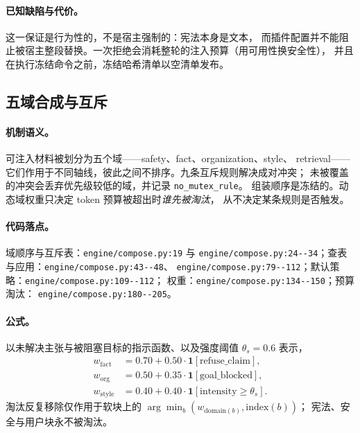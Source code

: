 \paragraph{已知缺陷与代价。} 这一保证是行为性的，不是宿主强制的：宪法本身是文本，
而插件配置并不能阻止被宿主整段替换。一次拒绝会消耗整轮的注入预算（用可用性换安全性），
并且在执行冻结命令之前，冻结哈希清单以空清单发布。

\subsection{五域合成与互斥}

\paragraph{机制语义。} 可注入材料被划分为五个域——safety、fact、organization、style、
retrieval——它们作用于不同轴线，彼此之间不排序。九条互斥规则解决成对冲突；
未被覆盖的冲突会丢弃优先级较低的域，并记录 \texttt{no\_mutex\_rule}。
组装顺序是冻结的。动态域权重只决定 token 预算被超出时\emph{谁先被淘汰}，
从不决定某条规则是否触发。

\paragraph{代码落点。} 域顺序与互斥表：\texttt{engine/\allowbreak{}compose.\allowbreak{}py:\allowbreak{}19} 与
\texttt{engine/\allowbreak{}compose.\allowbreak{}py:\allowbreak{}24-\allowbreak{}-\allowbreak{}34}；查表与应用：\texttt{engine/\allowbreak{}compose.\allowbreak{}py:\allowbreak{}43-\allowbreak{}-\allowbreak{}48}、
\texttt{engine/\allowbreak{}compose.\allowbreak{}py:\allowbreak{}79-\allowbreak{}-\allowbreak{}112}；默认策略：\texttt{engine/\allowbreak{}compose.\allowbreak{}py:\allowbreak{}109-\allowbreak{}-\allowbreak{}112}；
权重：\texttt{engine/\allowbreak{}compose.\allowbreak{}py:\allowbreak{}134-\allowbreak{}-\allowbreak{}150}；预算淘汰：
\texttt{engine/\allowbreak{}compose.\allowbreak{}py:\allowbreak{}180-\allowbreak{}-\allowbreak{}205}。

\paragraph{公式。} 以未解决主张与被阻塞目标的指示函数、以及强度阈值 $\theta_s = 0.6$ 表示，
{\small
\begin{equation}
\begin{aligned}
w_{\mathrm{fact}} &= 0.70 + 0.50\cdot\mathbf{1}[\mathrm{refuse\_claim}],\\
w_{\mathrm{org}} &= 0.50 + 0.35\cdot\mathbf{1}[\mathrm{goal\_blocked}],\\
w_{\mathrm{style}} &= 0.40 + 0.40\cdot\mathbf{1}[\mathrm{intensity} \ge \theta_s].
\end{aligned}
\end{equation}
}
淘汰反复移除仅作用于软块上的 $\arg\min_b (w_{\mathrm{domain}(b)}, \mathrm{index}(b))$；
宪法、安全与用户块永不被淘汰。

